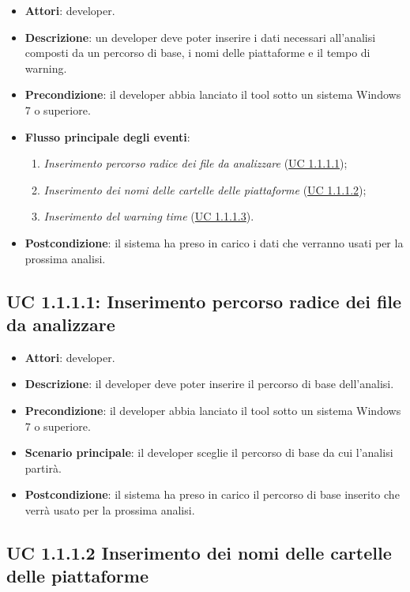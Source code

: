 		\begin{itemize}
			\item\textbf{Attori}: developer.
			\item\textbf{Descrizione}: un developer deve poter inserire i dati necessari all'analisi composti da un percorso di base, i nomi delle piattaforme e il tempo di warning.
			\item\textbf{Precondizione}: il developer abbia lanciato il tool sotto un sistema Windows 7 o superiore.
			\item\textbf{Flusso principale degli eventi}: 
			\begin{enumerate}
				\item\textit{Inserimento percorso radice dei file da analizzare} (\hyperref[subsec:UC1.1.1.1]{UC 1.1.1.1});
				\item\textit{Inserimento dei nomi delle cartelle delle piattaforme} (\hyperref[subsec:UC1.1.1.2]{UC 1.1.1.2});
				\item\textit{Inserimento del warning time} (\hyperref[subsec:UC1.1.1.3]{UC 1.1.1.3}).
			\end{enumerate}
			\item\textbf{Postcondizione}: il sistema ha preso in carico i dati che verranno usati per la prossima analisi.
		\end{itemize}
		
	\newpage
	\subsection{UC 1.1.1.1: Inserimento percorso radice dei file da analizzare}
		\label{subsec:UC1.1.1.1}
		
		\begin{itemize}
			\item\textbf{Attori}: developer.
			\item\textbf{Descrizione}: il developer deve poter inserire il percorso di base dell'analisi.
			\item\textbf{Precondizione}: il developer abbia lanciato il tool sotto un sistema Windows 7 o superiore.
			\item\textbf{Scenario principale}: il developer sceglie il percorso di base da cui l'analisi partirà.
			\item\textbf{Postcondizione}: il sistema ha preso in carico il percorso di base inserito che verrà usato per la prossima analisi.
		\end{itemize}

	\subsection{UC 1.1.1.2 Inserimento dei nomi delle cartelle delle piattaforme}
		\label{subsec:UC1.1.1.2}
	
